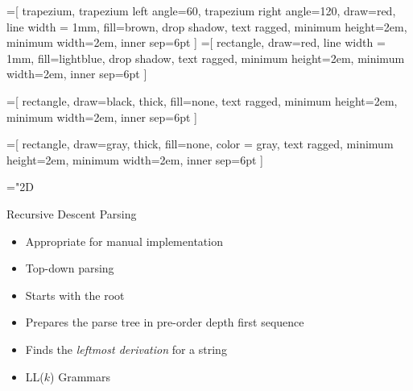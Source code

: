 \documentclass{beamer}
\begin{document}
=[%
      trapezium, trapezium left angle=60, trapezium right angle=120, draw=red, line width = 1mm, fill=brown, drop shadow,
      text ragged, minimum height=2em, minimum width=2em, inner sep=6pt
]
=[%
      rectangle, draw=red, line width = 1mm, fill=lightblue, drop shadow,
      text ragged, minimum height=2em, minimum width=2em, inner sep=6pt
]

=[%
      rectangle, draw=black, thick, fill=none,
      text ragged, minimum height=2em, minimum width=2em, inner sep=6pt
]

=[%
      rectangle, draw=gray, thick, fill=none, color = gray,
      text ragged, minimum height=2em, minimum width=2em, inner sep=6pt
]



\mathchardef\mhyphen="2D


\begin{frame}{Recursive Descent Parsing}

\pause
\begin{itemize}
	\item Appropriate for manual implementation
	\item Top-down parsing
	\item Starts with the root
	\item Prepares the parse tree in pre-order depth first sequence
	\item Finds the \textit{leftmost derivation} for a string
	\item LL($k$) Grammars
\end{itemize}
\end{frame}
\end{document}
